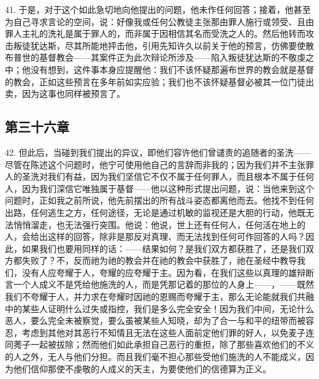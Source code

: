 41. 于是，对于这个如此急切地向他提出的问题，他未作任何回答；接着，他甚至为自己寻求言论的空间，说：好像我或任何公教徒主张那由罪人施行或领受、且由罪人主礼的洗礼是属于罪人的，而非属于因相信其名而受洗之人的。然后他转而攻击叛徒犹达斯，尽其所能地抨击他，引用先知许久以前关于他的预言，仿佛要使散布普世的基督教会——其案件正为此次辩论所涉及——陷入叛徒犹达斯的不敬虔之中；他没有想到，这件事本身应提醒他：我们不该怀疑那遍布世界的教会就是基督的教会，正如这些预言在多年前如实应验；我们也不该怀疑基督必被其一位门徒出卖，因为这事也同样被预言了。\par


\subsection{第三十六章}

42. 但此后，当碰到我们提出的异议，即他们容许他们曾谴责的追随者的圣洗——尽管在陈述这个问题时，他宁可使用他自己的言辞而非我的；因为我们并不主张罪人的圣洗对我们有益，因为我们坚信它不仅不属于任何罪人，而且根本不属于任何人，因为我们深信它唯独属于基督——他以这种形式提出问题，说：当他来到这个问题时，正如我之前所说，他先前摆出的所有战斗姿态都离他而去。他找不到任何出路，任何逃生之方，任何途径，无论是通过机敏的监视还是大胆的行动，他既无法悄悄溜走，也无法强行突围。他说：他说，世上还有任何人，任何活在地上的人，会给出这样的回答，除非是那反对真理、而无法找到任何可作回答的人吗？因此，如果我们也要用同样的话：——结果如何？是我们双方都获胜了，还是我们双方都失败了？不，反而祂为祂的教会并在祂的教会中获胜了，祂在圣经中教导我们，没有人应夸耀于人，夸耀的应夸耀于主。因为看，在我们这些以真理的雄辩断言一个人成义不是凭给他施洗的人，而是凭那记着的那位的人身上——，——既然我们不夸耀于人，并力求在夸耀时因祂的恩赐而夸耀于主，那么无论能就我们共融中的某些人证明什么过失或指控，我们是多么完全安全！因为我们中间，无论什么恶人，要么完全未被察觉，要么虽被某些人知晓，却为了合一与和平的纽带而被容忍，考虑到其他对其恶行不知情且无法在这些人面前定他们罪的好人，以免麦子连同莠子一起被拔除；然而他们如此承担自己恶行的重担，除了那些喜欢他们的不义的人之外，无人与他们分担。而且我们毫不担心那些受他们施洗的人不能成义，因为他们信仰那使不虔敬的人成义的天主，为要使他们的信德算为正义。\par

